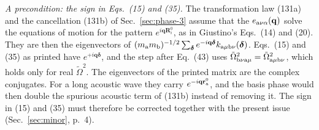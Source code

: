 \documentclass[11pt]{article}
\begin{document}
\emph{A precondition: the sign in Eqs.~(15) and (35).} The transformation law (131a) and the
cancellation (131b) of Sec.~\ref{sec:phase-3} assume that the $e_{{\rm a}\nu\alpha}(\mathbf q)$ solve the equations of motion
for the pattern $e^{i\mathbf q\mathbf R^0_i}$, as in Giustino's Eqs.~(14) and (20). They are then the
eigenvectors of $(m_{\rm a}m_{\rm b})^{-1/2}\sum_{\bm{\delta}}e^{-i\mathbf q\bm{\delta}}
k_{{\rm a}\mu{\rm b}\nu}(\bm{\delta})$. Eqs.~(15) and (35) as printed have $e^{+i\mathbf q\bm{\delta}}$, and the
step after Eq.~(43) uses $\tilde\Omega^2_{{\rm b}\nu{\rm a}\mu}=\tilde\Omega^2_{{\rm a}\mu{\rm b}\nu}$, which
holds only for real $\tilde\Omega^2$. The eigenvectors of the printed matrix are the complex conjugates.
For a long acoustic wave they carry $e^{-i\mathbf q\mathbf r^0_{\rm a}}$, and the basis phase would then
double the spurious acoustic term of (131b) instead of removing it. The sign in (15) and (35) must
therefore be corrected together with the present issue (Sec.~\ref{sec:minor}, p.~4).
\end{document}
